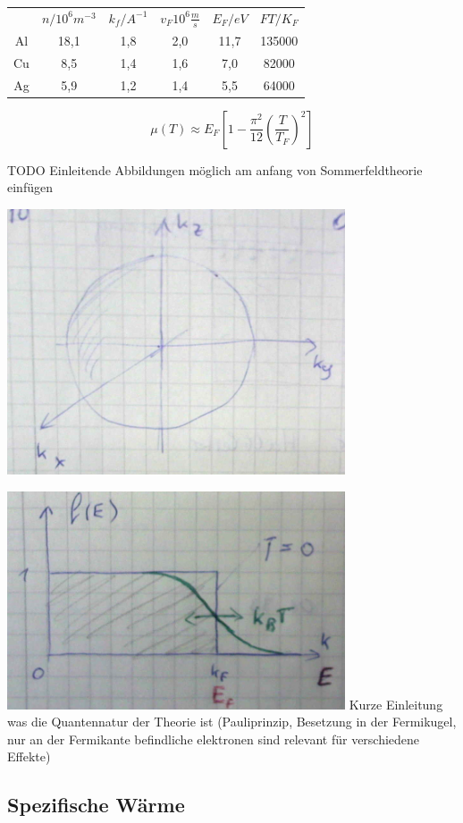 \begin{tabular}{cccccc}
&\(n/10^{6}m^{-3}\)&\(k_f/A^{-1}\)&\(v_F10^{6}\frac{m}{s}\)&\(E_F/eV\)&\(FT/K_F\)\\
Al&18,1&1,8&2,0&11,7&135000\\
Cu&8,5&1,4&1,6&7,0&82000\\
Ag&5,9&1,2&1,4&5,5&64000
\end{tabular}


\[\boxed{\mu(T)\approx E_F [1-\frac{\pi^2}{12}\left(\frac{T}{T_F}\right)^2]}\]


TODO Einleitende Abbildungen möglich am anfang von Sommerfeldtheorie einfügen


\includegraphics[width=0.75\textwidth]{kap06_27.png}


\includegraphics[width=0.75\textwidth]{kap06_28.png}
Kurze Einleitung was die Quantennatur der Theorie ist (Pauliprinzip, Besetzung in der Fermikugel, nur an der Fermikante befindliche elektronen sind relevant für verschiedene Effekte)

\subsection{Spezifische Wärme}

